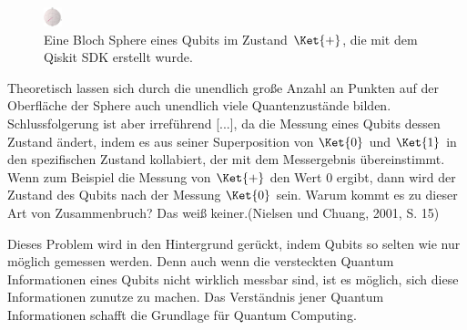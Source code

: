 \begin{figure}
    \centering
    \includegraphics[width=20]{content/bloch_plus.jpg}
    \caption{Eine Bloch Sphere eines Qubits im Zustand \(\Ket{+}\), die mit dem Qiskit SDK erstellt wurde.}
    \label{fig:blochPlus}
\end{figure}





Theoretisch lassen sich durch die unendlich große Anzahl an Punkten auf der Oberfläche der Sphere auch unendlich viele Quantenzustände bilden. \glqqDiese Schlussfolgerung ist aber irreführend [...], da  die Messung eines Qubits dessen Zustand ändert, indem es aus seiner Superposition von \(\Ket{0}\) und \(\Ket{1}\) in den spezifischen Zustand kollabiert, der mit dem Messergebnis übereinstimmt. Wenn zum Beispiel die Messung von \(\Ket{+}\) den Wert 0 ergibt, dann wird der Zustand des Qubits nach der Messung \(\Ket{0}\) sein. Warum kommt es zu dieser Art von Zusammenbruch? Das weiß keiner.\grqq (Nielsen und Chuang, 2001, S. 15) \newline


Dieses Problem wird in den Hintergrund gerückt, indem Qubits so selten wie nur möglich gemessen werden. Denn auch wenn die versteckten Quantum Informationen eines Qubits nicht wirklich messbar sind, ist es möglich, sich diese Informationen zunutze zu machen. Das Verständnis jener Quantum Informationen schafft die Grundlage für Quantum Computing. \newline \newline

